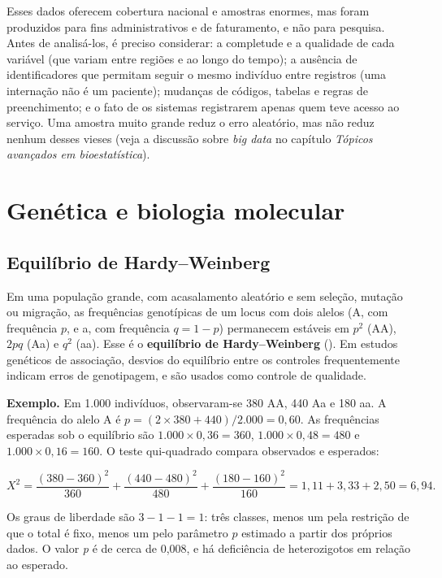 \documentclass[
]{book}
\begin{document}
Esses dados oferecem cobertura nacional e amostras enormes, mas foram produzidos para fins administrativos e de faturamento, e não para pesquisa. Antes de analisá-los, é preciso considerar: a completude e a qualidade de cada variável (que variam entre regiões e ao longo do tempo); a ausência de identificadores que permitam seguir o mesmo indivíduo entre registros (uma internação não é um paciente); mudanças de códigos, tabelas e regras de preenchimento; e o fato de os sistemas registrarem apenas quem teve acesso ao serviço. Uma amostra muito grande reduz o erro aleatório, mas não reduz nenhum desses vieses (veja a discussão sobre \emph{big data} no capítulo \emph{Tópicos avançados em bioestatística}).

\section{Genética e biologia molecular}\label{genuxe9tica-e-biologia-molecular}

\subsection{Equilíbrio de Hardy--Weinberg}\label{equiluxedbrio-de-hardyweinberg}

Em uma população grande, com acasalamento aleatório e sem seleção, mutação ou migração, as frequências genotípicas de um locus com dois alelos (A, com frequência \(p\), e a, com frequência \(q = 1 - p\)) permanecem estáveis em \(p^2\) (AA), \(2pq\) (Aa) e \(q^2\) (aa). Esse é o \textbf{equilíbrio de Hardy--Weinberg} (). Em estudos genéticos de associação, desvios do equilíbrio entre os controles frequentemente indicam erros de genotipagem, e são usados como controle de qualidade.

\textbf{Exemplo.} Em 1.000 indivíduos, observaram-se 380 AA, 440 Aa e 180 aa. A frequência do alelo A é \(p = (2 \times 380 + 440)/2.000 = 0{,}60\). As frequências esperadas sob o equilíbrio são \(1.000 \times 0{,}36 = 360\), \(1.000 \times 0{,}48 = 480\) e \(1.000 \times 0{,}16 = 160\). O teste qui-quadrado compara observados e esperados:

\[
X^2 = \frac{(380 - 360)^2}{360} + \frac{(440 - 480)^2}{480} + \frac{(180 - 160)^2}{160} = 1{,}11 + 3{,}33 + 2{,}50 = 6{,}94 .
\]

Os graus de liberdade são \(3 - 1 - 1 = 1\): três classes, menos um pela restrição de que o total é fixo, menos um pelo parâmetro \(p\) estimado a partir dos próprios dados. O valor \emph{p} é de cerca de 0,008, e há deficiência de heterozigotos em relação ao esperado.
\end{document}
